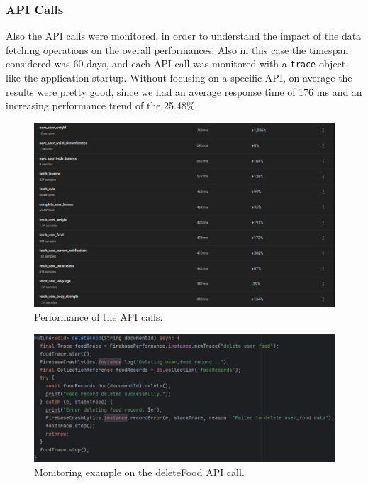 \subsubsection{API Calls}
Also the API calls were monitored, in order to understand the impact of the data fetching operations on the overall performances. Also in this case the timespan considered was 60 days, and each API call was monitored with a \texttt{trace} object, like the application startup. Without focusing on a specific API, on average the results were pretty good, since we had an average response time of 176 ms and an increasing performance trend of the 25.48\%. 
\vspace{10ex}
\begin{figure}
    \centering
    \includegraphics[width=0.8\linewidth]{./images/apiPerformances.jpg}
    \caption{Performance of the API calls.}
\end{figure}

\begin{figure}
    \centering
    \includegraphics[width=0.8\linewidth]{./images/deleteFoodMonitoring.jpg}
    \caption{Monitoring example on the deleteFood API call.}
\end{figure}
\newpage
